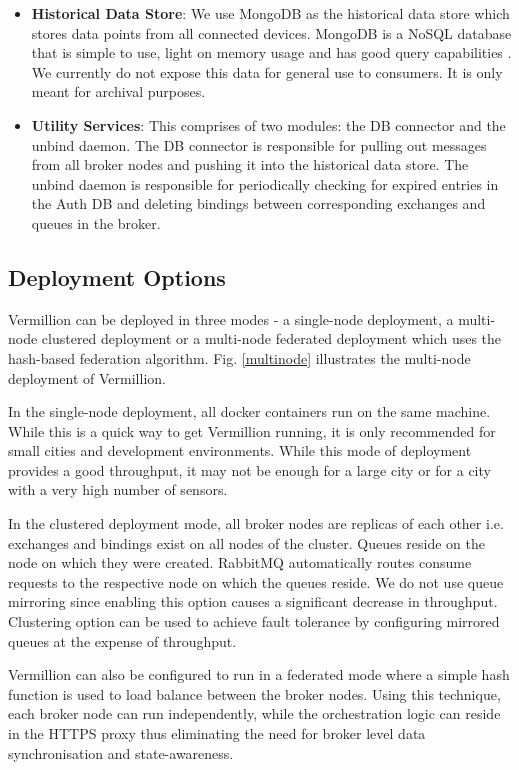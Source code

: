 \documentclass[conference, 10pt]{IEEEtran}
\begin{document}
\begin{itemize}
\item \textbf{Historical Data Store}: We use MongoDB as the historical data store which stores data points from all connected devices. MongoDB is a NoSQL database that is simple to use, light on memory usage and has good query capabilities \cite{mongo}. We currently do not expose this data for general use to consumers. It is only meant for archival purposes.

\item \textbf{Utility Services}: This comprises of two modules: the DB connector and the unbind daemon. The DB connector is responsible for pulling out messages from all broker nodes and pushing it into the historical data store. The unbind daemon is responsible for periodically checking for expired entries in the Auth DB and deleting bindings between corresponding exchanges and queues in the broker.
\end{itemize}

\subsection{Deployment Options}
Vermillion can be deployed in three modes - a single-node deployment, a multi-node clustered deployment or a multi-node federated deployment which uses the hash-based federation algorithm. Fig. \ref{multinode} illustrates the multi-node deployment of Vermillion. 

In the single-node deployment, all docker containers run on the same machine. While this is a quick way to get Vermillion running, it is only recommended for small cities and development environments. While this mode of deployment provides a good throughput, it may not be enough for a large city or for a city with a very high number of sensors.

In the clustered deployment mode, all broker nodes are replicas of each other i.e. exchanges and bindings exist on all nodes of the cluster. Queues reside on the node on which they were created. RabbitMQ automatically routes consume requests to the respective node on which the queues reside. We do not use queue mirroring since enabling this option causes a significant decrease in throughput. Clustering option can be used to achieve fault tolerance by configuring mirrored queues at the expense of throughput.

Vermillion can also be configured to run in a federated mode where a simple hash function is used to load balance between the broker nodes. Using this technique, each broker node can run independently, while the orchestration logic can reside in the HTTPS proxy thus eliminating the need for broker level data synchronisation and state-awareness. 
\end{document}
